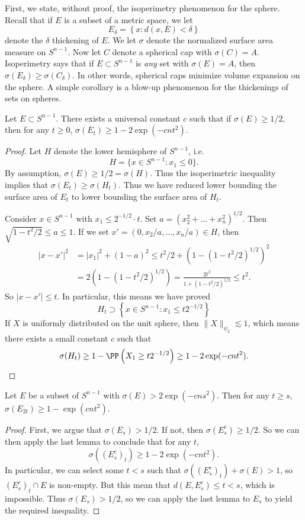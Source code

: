 First, we state, without proof, the isoperimetry phenomenon for the sphere. Recall that if $E$ is a subset of a metric space, we let
%
\[ E_\delta = \left\{ x : d(x,E) < \delta \right\} \]
%
denote the $\delta$ thickening of $E$. We let $\sigma$ denote the normalized surface area measure on $S^{n-1}$. Now let $C$ denote a spherical cap with $\sigma(C) = A$. Isoperimetry says that if $E \subset S^{n-1}$ is \emph{any} set with $\sigma(E) = A$, then $\sigma(E_\delta) \geq \sigma(C_\delta)$. In other words, spherical caps minimize volume expansion on the sphere. A simple corollary is a blow-up phenomenon for the thickenings of sets on spheres.

\begin{lemma}
    Let $E \subset S^{n-1}$. There exists a universal constant $c$ such that if $\sigma(E) \geq 1/2$, then for any $t \geq 0$, $\sigma(E_t) \geq 1 - 2\exp(-cnt^2)$.
\end{lemma}
\begin{proof}
    Let $H$ denote the lower hemisphere of $S^{n-1}$, i.e.
    \[ H = \{ x \in S^{n-1} : x_1 \leq 0 \}. \]
    By assumption, $\sigma(E) \geq 1/2 = \sigma(H)$. Thus the isoperimetric inequality implies that $\sigma(E_t) \geq \sigma(H_t)$. Thus we have reduced lower bounding the surface area of $E_t$ to lower bounding the surface area of $H_t$.

    Consider $x \in S^{n-1}$ with $x_1 \leq 2^{-1/2} \cdot t$. Set $a = (x_2^2 + \dots + x_n^2)^{1/2}$. Then $\sqrt{1 - t^2/2} \leq a \leq 1$. If we set $x' = \left( 0, x_2/a, \dots, x_n/a \right) \in H$, then
    \begin{align*}
        |x - x'|^2 &= |x_1|^2 + (1 - a)^2 \leq t^2/2 + \left(1 - (1 - t^2/2)^{1/2} \right)^2\\
        &= 2 \left(1 - (1 - t^2/2)^{1/2} \right) = \frac{2t^2}{1 + (1 - t^2/2)^{1/2}} \leq t^2.
    \end{align*}
    So $|x - x'| \leq t$. In particular, this means we have proved
    \[ H_t \supset \left\{ x \in S^{n-1} : x_1 \leq t 2^{-1/2} \right\} \]
    If $X$ is uniformly distributed on the unit sphere, then $\| X \|_{\psi_2} \lesssim 1$, which means there exists a small constant $c$ such that
    \[ \sigma(H_t) \geq 1 - \PP \left( X_1 \geq t 2^{-1/2} \right) \geq 1 - 2 \exp(-cn t^2). \qedhere \]
\end{proof}

\begin{lemma}
    Let $E$ be a subset of $S^{n-1}$ with $\sigma(E) > 2 \exp(-cns^2)$. Then for any $t \geq s$, $\sigma(E_{2t}) \geq 1 - \exp(cnt^2)$.
\end{lemma}
\begin{proof}
    First, we argue that $\sigma(E_s) > 1/2$. If not, then $\sigma(E_s^c) \geq 1/2$. So we can then apply the last lemma to conclude that for any $t$,
    \[ \sigma((E_s^c)_t) \geq 1 - 2 \exp(-cn t^2). \]
    In particular, we can select some $t < s$ such that $\sigma((E_s^c)_t) + \sigma(E) > 1$, so $(E_s^c)_t \cap E$ is non-empty. But this mean that $d(E,E_s^c) \leq t < s$, which is impossible. Thus $\sigma(E_s) > 1/2$, so we can apply the last lemma to $E_s$ to yield the required inequality.
\end{proof}

